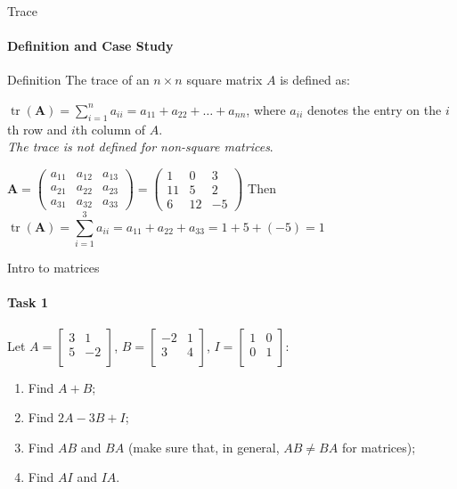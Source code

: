 \documentclass[aspectratio=169,notes]{beamer}
\begin{document}
\begin{frame}[t]{Trace}
\framesubtitle{Definition and Case Study}
\vspace{-0.3cm}
\begin{exampleblock}{Definition}
    The trace of an $n \times n$ square matrix $A$ is defined as:

    $\operatorname {tr} (\mathbf {A} )=\sum _{i=1}^{n}a_{ii}=a_{11}+a_{22}+\dots +a_{nn}$, where $a_{ii}$ denotes the entry on the $i$th row and $i$th column of $A$.\\  \textit{The trace is not defined for non-square matrices}.
\end{exampleblock}
$\mathbf {A} ={\begin{pmatrix}a_{11}&a_{12}&a_{13}\\a_{21}&a_{22}&a_{23}\\a_{31}&a_{32}&a_{33}\end{pmatrix}}={\begin{pmatrix}1&0&3\\11&5&2\\6&12&-5\end{pmatrix}}$
Then 
\begin{equation*}
    \operatorname {tr} (\mathbf {A} )=\sum _{i=1}^{3}a_{ii}=a_{11}+a_{22}+a_{33}=1+5+(-5)=1
    \phantom{\hspace{6cm}}
\end{equation*}
\end{frame}

\begin{frame}[t]{Intro to matrices}
    \framesubtitle{Task 1}
    Let $A=\begin{bmatrix} 3 & 1 \\ 5 & -2 \\ \end{bmatrix}$, $B=\begin{bmatrix} -2 & 1 \\ 3 & 4 \\ \end{bmatrix}$, $I=\begin{bmatrix} 1 & 0 \\ 0 & 1 \\ \end{bmatrix}$:
\begin{enumerate}
    \item Find $A+B$;
    \item Find $2A-3B+I$;
    \item Find $AB$ and $BA$ (make sure that, in general, $AB \neq BA$ for matrices);
    \item Find $AI$ and $IA$.
\end{enumerate}
\end{frame}
\end{document}
